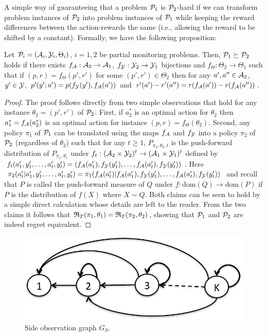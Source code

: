 A simple way of guaranteeing that a problem $\P_1$ is $\P_2$-hard if we can transform problem instances of $\P_2$ into 
problem instances of $\P_1$ while keeping the reward differences between the action-rewards the same (i.e., allowing the reward to be shifted by a constant).
Formally, we have the following proposition:
\begin{proposition}
Let $\P_i = (\A_i,\Y_i,\Theta_i)$, $i=1,2$ be partial monitoring problems.
Then, $\P_1\succeq \P_2$ holds if there exists $f_{\A}:\A_2\to \A_1$, $f_{\Y}: \Y_2 \to \Y_1$ bijections and $f_{\Theta}:\Theta_2\to \Theta_1$ such that if $(p,r) = f_{\Theta}(p',r')$ for some $(p',r')\in \Theta_2$ then
for any $a',a''\in \A_2$, $y'\in \Y$,
$p'(y';a') = p(f_\Y(y'),f_\A(a'))$ and $r'(a')-r'(a'') = r(f_\A(a')) - r(f_\A(a''))$.
\end{proposition}
\begin{proof}
The proof follows directly from two simple observations 
that hold for any instance $\theta_2 = (p',r')$ of $\P_2$: 
First, if $a_2^*$ is an optimal action for $\theta_2$
then $a_1^*=f_\A(a_2^*)$ is an optimal action for instance $(p,r) = f_\Theta(\theta_2)$.
Second, any policy $\pi_1$ of $\P_1$ can be translated using the maps $f_\A$ and $f_\Y$ into a policy $\pi_2$ of $\P_2$ (regardless of $\theta_2$) such that
for any $t\ge 1$,
$P_{\pi_2,\theta_2,t}$ is the push-forward distribution 
of $P_{\pi_1,\theta_1}$ under $f_t:(\A_2\times \Y_2)^t \to (\A_1\times \Y_1)^t$
defined by $f_t(a_1',y_1',\dots,a_t',y_t') = (f_\A(a_1'),f_\Y(y_1'),\dots,f_\A(a_t'),f_\Y(y_t'))$. 
Here $\pi_2(a'_t|a_1',y_1',\dots,a_t',y_t') = \pi_1( f_\A(a_t')| f_\A(a_1'),f_\Y(y_1'),\dots,f_\A(a_t'),f_\Y(y_t'))$ and recall that $P$ is called the push-forward measure of $Q$ under $f:\mathrm{dom}(Q)\to \mathrm{dom}(P)$ if $P$ is the distribution of $f(X)$ where $X\sim Q$.
Both claims can be seen to hold by a simple direct calculation whose details are left 
to the reader.
From the two claims it follows that $\Regret_T(\pi_1,\theta_1)
= \Regret_T(\pi_2,\theta_2)$, showing that $\P_1$ and $\P_2$ are indeed
regret equivalent.
\end{proof}

\fi



\begin{figure}
	\centering
	\includegraphics[scale=.4]{../Figures/SideInfoGraph.pdf}
	\caption{Side observation graph $G_S$. }
	\label{fig:SideObservationGraph]}
\end{figure} 

